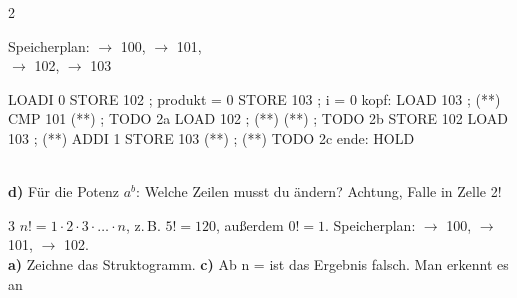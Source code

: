 \documentclass[11pt,a4paper]{article}
\begin{document}
\newpage
\begin{aufgabe}{2}
\begin{minipage}[t]{0.40\linewidth}
\vspace{1mm}
{\small Speicherplan:  $\to$ 100,  $\to$ 101,\\  $\to$ 102,  $\to$ 103}\\[2mm]
\end{minipage}\hfill
\begin{minipage}[t]{0.56\linewidth}
\vspace{0pt}
\begin{asmluecke}[aboveskip=0mm,basicstyle=\linespread{1.25}\small\ttfamily]
      LOADI 0
      STORE 102   ; produkt = 0
      STORE 103   ; i = 0
kopf: LOAD 103    ; (**)
      CMP 101
      (**)  ; TODO 2a
      LOAD 102    ; (**)
      (**)  ; TODO 2b
      STORE 102
      LOAD 103    ; (**)
      ADDI 1
      STORE 103
      (**)  ; (**) TODO 2c
ende: HOLD
\end{asmluecke}
\end{minipage}\\[1mm]
\lueckentext
\textbf{d)} Für die Potenz $a^b$: Welche Zeilen musst du ändern? Achtung, Falle in Zelle 2!
\end{aufgabe}

\begin{aufgabe}{3}
\lueckentext
$n! = 1 \cdot 2 \cdot 3 \cdot … \cdot n$, z.\,B. $5! = 120$, außerdem $0! = 1$. Speicherplan:  $\to$ 100,  $\to$ 101,  $\to$ 102.\\
\textbf{a)} Zeichne das Struktogramm.
\textbf{c)} Ab n =  ist das Ergebnis falsch. Man erkennt es an 
\end{aufgabe}
\end{document}
